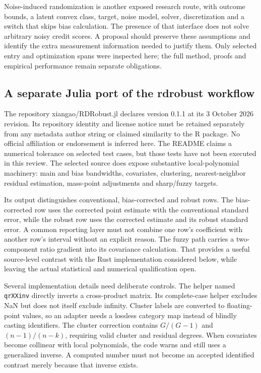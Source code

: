 Noise-induced randomization is another exposed research route, with
outcome bounds, a latent convex class, target, noise model, solver,
discretization and a switch that skips bias calculation. The presence
of that interface does not solve arbitrary noisy credit scores. A
proposal should preserve these assumptions and identify the extra
measurement information needed to justify them. Only selected entry
and optimization spans were inspected here; the full method, proofs
and empirical performance remain separate obligations.
\citep{exec23_otheriv_source_1}

\subsection{A separate Julia port of the rdrobust workflow}
\label{exec23:otheriv-port}
The repository xiangao/RDRobust.jl declares version 0.1.1 at its
3 October 2026 revision. Its repository identity and license notice
must be retained separately from any metadata author string or claimed
similarity to the R package. No official affiliation or endorsement is
inferred here. The README claims a numerical tolerance on selected test
cases, but those tests have not been executed in this review. The
selected source does expose substantive local-polynomial machinery: main
and bias bandwidths, covariates, clustering, nearest-neighbor residual
estimation, mass-point adjustments and sharp/fuzzy targets.
\citep{exec23_otheriv_source_3}

Its output distinguishes conventional, bias-corrected and robust rows.
The bias-corrected row uses the corrected point estimate with the
conventional standard error, while the robust row uses the corrected
estimate and its robust standard error. A common reporting layer must
not combine one row's coefficient with another row's interval without
an explicit reason. The fuzzy path carries a two-component ratio
gradient into its covariance calculation. That provides a useful
source-level contrast with the Rust implementation considered below,
while leaving the actual statistical and numerical qualification open.
\citep{exec23_otheriv_source_3}

Several implementation details need deliberate controls. The helper
named \texttt{qrXXinv} directly inverts a cross-product matrix. Its
complete-case helper excludes NaN but does not itself exclude infinity.
Cluster labels are converted to floating-point values, so an adapter
needs a lossless category map instead of blindly casting identifiers.
The cluster correction contains $G/(G-1)$ and $(n-1)/(n-k)$, requiring
valid cluster and residual degrees. When covariates become collinear
with local polynomials, the code warns and still uses a generalized
inverse. A computed number must not become an accepted identified
contrast merely because that inverse exists.
\citep{exec23_otheriv_source_3}

